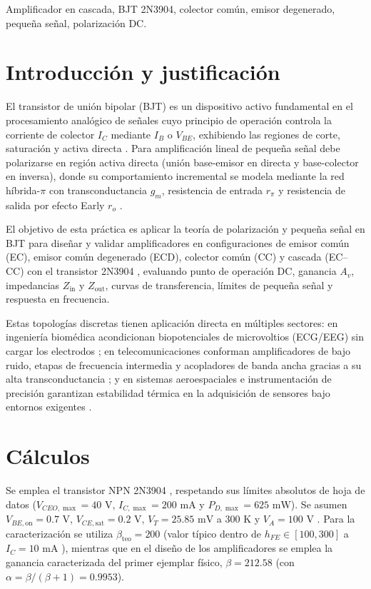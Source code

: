 \documentclass[conference]{IEEEtran}
\begin{document}
\begin{IEEEkeywords}
Amplificador en cascada, BJT 2N3904, colector com\'un, emisor degenerado, peque\~na se\~nal, polarizaci\'on DC.
\end{IEEEkeywords}

\section{Introducci\'on y justificaci\'on}

El transistor de uni\'on bipolar (BJT) es un dispositivo activo fundamental en el procesamiento anal\'ogico de se\~nales cuyo principio de operaci\'on controla la corriente de colector $I_C$ mediante $I_B$ o $V_{BE}$, exhibiendo las regiones de corte, saturaci\'on y activa directa \cite{sedra2020}. Para amplificaci\'on lineal de peque\~na se\~nal debe polarizarse en regi\'on activa directa (uni\'on base-emisor en directa y base-colector en inversa), donde su comportamiento incremental se modela mediante la red h\'ibrida-$\pi$ con transconductancia $g_m$, resistencia de entrada $r_\pi$ y resistencia de salida por efecto Early $r_o$ \cite{sedra2020}.

El objetivo de esta pr\'actica es aplicar la teor\'ia de polarizaci\'on y peque\~na se\~nal en BJT para dise\~nar y validar amplificadores en configuraciones de emisor com\'un (EC), emisor com\'un degenerado (ECD), colector com\'un (CC) y cascada (EC--CC) con el transistor 2N3904 \cite{onsemi2021}, evaluando punto de operaci\'on DC, ganancia $A_v$, impedancias $Z_{\mathrm{in}}$ y $Z_{\mathrm{out}}$, curvas de transferencia, l\'imites de peque\~na se\~nal y respuesta en frecuencia.

Estas topolog\'ias discretas tienen aplicaci\'on directa en m\'ultiples sectores: en ingenier\'ia biom\'edica acondicionan biopotenciales de microvoltios (ECG/EEG) sin cargar los electrodos \cite{webster2010}; en telecomunicaciones conforman amplificadores de bajo ruido, etapas de frecuencia intermedia y acopladores de banda ancha gracias a su alta transconductancia \cite{razavi2012}; y en sistemas aeroespaciales e instrumentaci\'on de precisi\'on garantizan estabilidad t\'ermica en la adquisici\'on de sensores bajo entornos exigentes \cite{fortescue2011,horowitz2015}.

\section{C\'alculos}

Se emplea el transistor NPN 2N3904 \cite{onsemi2021}, respetando sus l\'imites absolutos de hoja de datos ($V_{CEO,\max} = 40\text{ V}$, $I_{C,\max} = 200\text{ mA}$ y $P_{D,\max} = 625\text{ mW}$). Se asumen $V_{BE,\mathrm{on}} = 0.7\text{ V}$, $V_{CE,\mathrm{sat}} = 0.2\text{ V}$, $V_T = 25.85\text{ mV}$ a $300\text{ K}$ y $V_A = 100\text{ V}$ \cite{sedra2020}. Para la caracterizaci\'on se utiliza $\beta_{\mathrm{teo}} = 200$ (valor t\'ipico dentro de $h_{FE} \in [100,300]$ a $I_C = 10\text{ mA}$ \cite{onsemi2021}), mientras que en el dise\~no de los amplificadores se emplea la ganancia caracterizada del primer ejemplar f\'isico, $\beta = 212.58$ (con $\alpha = \beta/(\beta+1) = 0.9953$).
\end{document}
